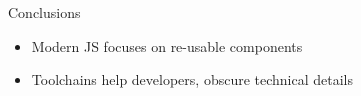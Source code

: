\documentclass[10pt]{beamer}
\begin{document}

\begin{frame}{Conclusions}
    \begin{itemize}
        \item Modern JS focuses on re-usable components
        \item Toolchains help developers, obscure technical details
    \end{itemize}
\end{frame}
\end{document}
